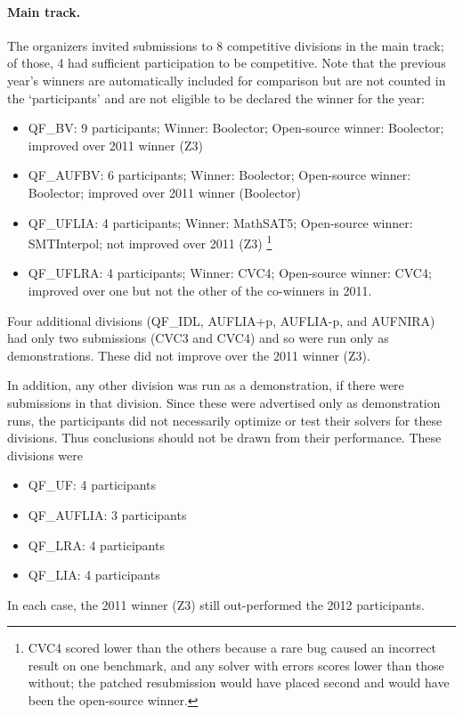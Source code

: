 \documentclass[twosize,11pt]{article}
\begin{document}
\paragraph{Main track.} The organizers invited submissions to 8 competitive divisions in the main track; of those, 4 had sufficient participation to be competitive. Note that the previous year's winners are automatically included for comparison but are not counted in the `participants' and are not eligible to be declared the winner for the year:
\begin{itemize}
\item QF\_BV: 9 participants; Winner: Boolector; Open-source winner: Boolector; improved over 2011 winner (Z3)
\item QF\_AUFBV: 6 participants; Winner: Boolector; Open-source winner: Boolector; improved over 2011 winner (Boolector)
\item QF\_UFLIA: 4 participants; Winner: MathSAT5; Open-source winner: SMTInterpol; not improved over 2011 (Z3)
\footnote{CVC4 scored lower than the others because a rare bug caused an incorrect result on one benchmark, and any solver with errors scores lower than those without; the patched resubmission would have placed second and would have been the open-source winner.}
\item QF\_UFLRA: 4 participants; Winner: CVC4; Open-source winner: CVC4; improved over one but not the other of the co-winners in 2011.
\end{itemize}

Four additional divisions (QF\_IDL, AUFLIA+p, AUFLIA-p, and AUFNIRA) had only two submissions (CVC3 and CVC4) and so were run only as demonstrations. These did not improve over the 2011 winner (Z3).

In addition, any other division was run as a demonstration, if there were submissions in that division. Since these were advertised only as demonstration runs, the participants did not necessarily optimize or test their solvers for these divisions. Thus conclusions should not be drawn from their performance. These divisions were
\begin{itemize}
\item QF\_UF: 4 participants
\item QF\_AUFLIA: 3 participants
\item QF\_LRA: 4 participants
\item QF\_LIA: 4 participants
\end{itemize}
In each case, the 2011 winner (Z3) still out-performed the 2012 participants.
\end{document}
